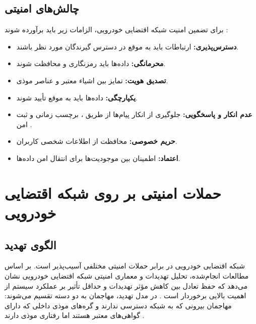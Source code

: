\documentclass[12pt,a4paper]{article}
\begin{document}
\subsection{چالش‌های امنیتی}

برای تضمین امنیت شبکه اقتضایی خودرویی، الزامات زیر باید برآورده شوند \cite{farsimadanReviewSecurityChallenges2025, VanetSecurityPrivacy}:

\begin{itemize}
\item \textbf{دسترس‌پذیری:} ارتباطات باید به موقع در دسترس گیرندگان مورد نظر باشند.
\item \textbf{محرمانگی:} داده‌ها باید رمزنگاری و محافظت شوند.
\item \textbf{تصدیق هویت:} تمایز بین اشیاء معتبر و عناصر موذی.
\item \textbf{یکپارچگی:} داده‌ها باید به موقع تأیید شوند.
\item \textbf{عدم انکار و پاسخگویی:} جلوگیری از انکار پیام‌ها از طریق ، برچسب زمانی و ثبت امن \cite{VanetSecurityPrivacy}.
\item \textbf{حریم خصوصی:} محافظت از اطلاعات شخصی کاربران.
\item \textbf{اعتماد:} اطمینان بین موجودیت‌ها برای انتقال امن داده‌ها.
\end{itemize}

\section{حملات امنیتی بر روی شبکه اقتضایی خودرویی}

\subsection{الگوی تهدید}

شبکه اقتضایی خودرویی در برابر حملات امنیتی مختلفی آسیب‌پذیر است. بر اساس مطالعات انجام‌شده، تحلیل تهدیدات و معماری امنیتی شبکه اقتضایی خودرویی نشان می‌دهد که حفظ تعادل بین کاهش مؤثر تهدیدات و حداقل تأثیر بر عملکرد سیستم از اهمیت بالایی برخوردار است \cite{SecuringVehicularAd, farsimadanReviewSecurityChallenges2025, VanetSecurityPrivacy, linGSISSecurePrivacyPreserving2007}. در مدل تهدید، مهاجمان به دو دسته تقسیم می‌شوند: مهاجمان بیرونی که به شبکه دسترسی ندارند و گره‌های موذی داخلی که دارای گواهی‌های معتبر هستند اما رفتاری موذی دارند \cite{farsimadanReviewSecurityChallenges2025}.
\end{document}
